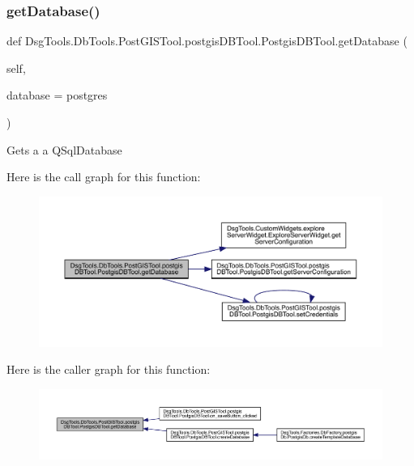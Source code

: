 \subsubsection{\texorpdfstring{get\+Database()}{getDatabase()}}
{\footnotesize\ttfamily def Dsg\+Tools.\+Db\+Tools.\+Post\+G\+I\+S\+Tool.\+postgis\+D\+B\+Tool.\+Postgis\+D\+B\+Tool.\+get\+Database (\begin{DoxyParamCaption}\item[{}]{self,  }\item[{}]{database = {\ttfamily \textquotesingle{}postgres\textquotesingle{}} }\end{DoxyParamCaption})}

\begin{DoxyVerb}Gets a a QSqlDatabase 
\end{DoxyVerb}
 Here is the call graph for this function\+:
\nopagebreak
\begin{figure}[H]
\begin{center}
\leavevmode
\includegraphics[width=350pt]{class_dsg_tools_1_1_db_tools_1_1_post_g_i_s_tool_1_1postgis_d_b_tool_1_1_postgis_d_b_tool_a26ad4391d1bd02ea5d91f99c762031c6_cgraph}
\end{center}
\end{figure}
Here is the caller graph for this function\+:
\nopagebreak
\begin{figure}[H]
\begin{center}
\leavevmode
\includegraphics[width=350pt]{class_dsg_tools_1_1_db_tools_1_1_post_g_i_s_tool_1_1postgis_d_b_tool_1_1_postgis_d_b_tool_a26ad4391d1bd02ea5d91f99c762031c6_icgraph}
\end{center}
\end{figure}
\mbox{\label{class_dsg_tools_1_1_db_tools_1_1_post_g_i_s_tool_1_1postgis_d_b_tool_1_1_postgis_d_b_tool_a6a72f1e483e8218f58d0e5ef7a2b19a0}} 
